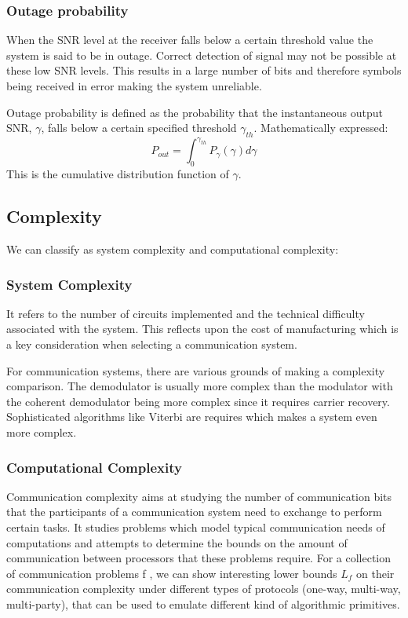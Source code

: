 \subsubsection{Outage probability}
When the \gls{SNR} level at the receiver falls below a certain threshold value the system is said to be in outage. Correct detection of signal may not be possible at these low \gls{SNR} levels. This results in a large number of bits and therefore \gls{symbol}s being received in error making the system unreliable\cite{MIMO}.

Outage probability is defined as the probability that the instantaneous output \gls{SNR}, $\gamma$, falls below a certain specified threshold $\gamma_{th}$\cite{dcommoha}. Mathematically expressed:
$$P_{out} = \int_0^{\gamma_{th}} P_{\gamma}\left(\gamma\right) d\gamma$$
This is the cumulative distribution function of $\gamma$.

\subsection{Complexity}
We can classify as system complexity and computational complexity:
\subsubsection*{System Complexity}
It refers to the number of circuits implemented and the technical difficulty associated with the system. This reflects upon the cost of manufacturing which is a key consideration when selecting a communication system. 

For communication systems,
there are various grounds of making a complexity comparison. The demodulator is usually more complex than the modulator with the coherent demodulator being more complex since it requires carrier recovery. Sophisticated algorithms like Viterbi are requires which makes a system even more complex.\cite{fuqin}

\subsubsection{Computational Complexity}
Communication complexity aims at studying the number of communication bits that the participants of a communication system need to exchange to perform certain tasks.  It studies problems which model typical communication needs of computations and attempts to determine the bounds on the amount of communication between processors that these problems require. For a collection of communication problems f , we can show interesting lower bounds $L_f$ on their communication complexity under different
types of protocols (one-way, multi-way, multi-party), that can be used to emulate different kind of
algorithmic primitives.


